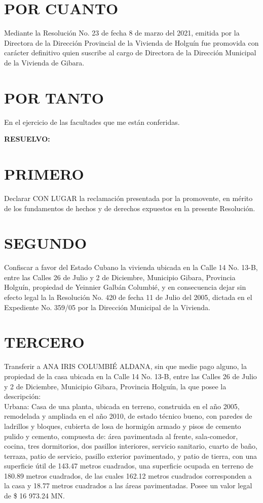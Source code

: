 \documentclass[11pt,letterpaper]{article}
\begin{document}
    \section{POR CUANTO}
        Mediante la Resolución No. 23 de fecha 8 de marzo del 2021, emitida por la Directora de la Dirección Provincial de la Vivienda de Holguín fue promovida con carácter definitivo quien suscribe al cargo de Directora de la Dirección Municipal de la Vivienda de Gibara.
    \section{POR TANTO}
        En el ejercicio de las facultades que me están conferidas.
    \begin{center}
        \textbf{RESUELVO:}
    \end{center}

    \section{PRIMERO}
        Declarar CON LUGAR la reclamación presentada por la promovente, en mérito de los fundamentos de hechos y de derechos expuestos en la presente Resolución.
    \section{SEGUNDO}
        Confiscar a favor del Estado Cubano la vivienda ubicada en la Calle 14 No. 13-B, entre las Calles 26 de Julio y 2 de Diciembre, Municipio Gibara, Provincia Holguín,  propiedad de Yeinnier Galbán Columbié, y en consecuencia dejar sin efecto legal la la Resolución No. 420 de fecha 11 de Julio del 2005, dictada en el Expediente No. 359/05 por la Dirección Municipal de la Vivienda.
    \section{TERCERO}
        Transferir a ANA IRIS COLUMBIÉ ALDANA, sin que medie pago alguno, la propiedad de la casa ubicada en la Calle 14 No. 13-B, entre las Calles 26 de Julio y 2 de Diciembre, Municipio Gibara, Provincia Holguín, la que posee la descripción:\\
    \noindent
        Urbana: Casa de una planta, ubicada en terreno, construida en el año 2005, remodelada  y ampliada en el año 2010, de estado técnico bueno, con paredes de ladrillos y bloques, cubierta de losa de hormigón armado y pisos de cemento pulido y cemento,  compuesta de: área pavimentada al frente, sala-comedor, cocina, tres dormitorios, dos pasillos interiores, servicio sanitario, cuarto de baño, terraza, patio de servicio, pasillo exterior pavimentado, y patio de tierra,  con una superficie útil de 143.47 metros cuadrados, una superficie ocupada en terreno de 180.89 metros cuadrados,  de las cuales 162.12 metros cuadrados corresponden a la casa y 18.77 metros cuadrados a las áreas pavimentadas. Posee un valor legal de \$ 16 973.24 MN.\\
        
\end{document}
